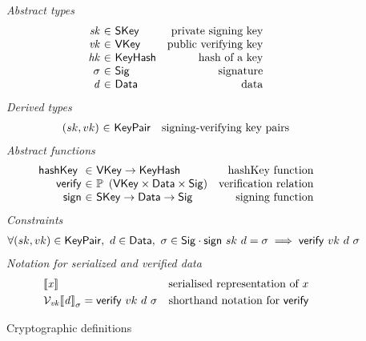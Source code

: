 \begin{figure}[htb]
  \emph{Abstract types}
  \begin{equation*}
    \begin{array}{r@{~\in~}lr}
      \var{sk} & \SKey & \text{private signing key}\\
      \var{vk} & \VKey & \text{public verifying key}\\
      \var{hk} & \KeyHash & \text{hash of a key}\\
      \sigma & \Sig  & \text{signature}\\
      \var{d} & \Data  & \text{data}\\
    \end{array}
  \end{equation*}
  \emph{Derived types}
  \begin{equation*}
    \begin{array}{r@{~\in~}lr}
      (sk, vk) & \KeyPair & \text{signing-verifying key pairs}
    \end{array}
  \end{equation*}
  \emph{Abstract functions}
  \begin{equation*}
    \begin{array}{r@{~\in~}lr}
      \hashKey{} & \VKey \to \KeyHash
                 & \text{hashKey function} \\
      \fun{verify} & \powerset{\left(\VKey \times \Data \times \Sig\right)}
                   & \text{verification relation}\\
      \fun{sign} & \SKey \to \Data \to \Sig
                 & \text{signing function}\\
    \end{array}
  \end{equation*}
  \emph{Constraints}
  \begin{align*}
    & \forall (sk, vk) \in \mathsf{KeyPair},~ d \in \mathsf{Data},~ \sigma \in \mathsf{Sig} \cdot
    \mathsf{sign} ~ sk ~ d = \sigma \implies \mathsf{verify} ~ vk ~ d ~ \sigma
  \end{align*}
  \emph{Notation for serialized and verified data}
  \begin{align*}
    & \llbracket \mathit{x} \rrbracket & \text{serialised representation of } x\\
    & \mathcal{V}_{\mathit{vk}}{\llbracket \mathit{d} \rrbracket}_{\sigma} = \mathsf{verify} ~ vk ~ d ~ \sigma
    & \text{shorthand notation for } \mathsf{verify}
  \end{align*}
  \caption{Cryptographic definitions}
  \label{fig:crypto-defs-shelley}
\end{figure}

